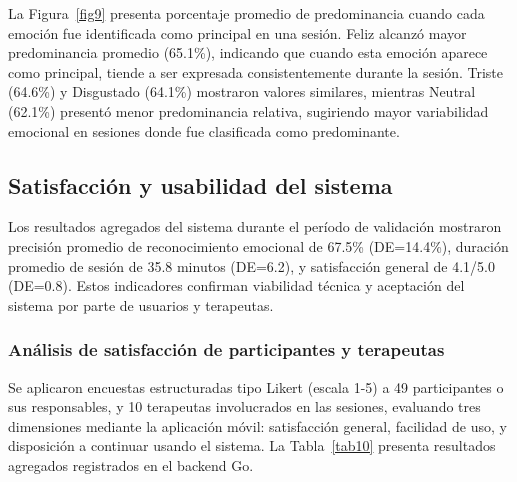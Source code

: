 \documentclass[journal,article,submit,pdftex,moreauthors]{Definitions/mdpi}
\begin{document}
	La Figura~\ref{fig9} presenta porcentaje promedio de predominancia cuando cada emoción fue identificada como principal en una sesión. Feliz alcanzó mayor predominancia promedio (65.1\%), indicando que cuando esta emoción aparece como principal, tiende a ser expresada consistentemente durante la sesión. Triste (64.6\%) y Disgustado (64.1\%) mostraron valores similares, mientras Neutral (62.1\%) presentó menor predominancia relativa, sugiriendo mayor variabilidad emocional en sesiones donde fue clasificada como predominante.
	
	\subsection{Satisfacción y usabilidad del sistema}
	
	Los resultados agregados del sistema durante el período de validación mostraron precisión promedio de reconocimiento emocional de 67.5\% (DE=14.4\%), duración promedio de sesión de 35.8 minutos (DE=6.2), y satisfacción general de 4.1/5.0 (DE=0.8). Estos indicadores confirman viabilidad técnica y aceptación del sistema por parte de usuarios y terapeutas.
	
	\subsubsection{Análisis de satisfacción de participantes y terapeutas}
	
	Se aplicaron encuestas estructuradas tipo Likert (escala 1-5) a 49 participantes o sus responsables, y 10 terapeutas involucrados en las sesiones, evaluando tres dimensiones mediante la aplicación móvil: satisfacción general, facilidad de uso, y disposición a continuar usando el sistema. La Tabla~\ref{tab10} presenta resultados agregados registrados en el backend Go.
	
\end{document}
